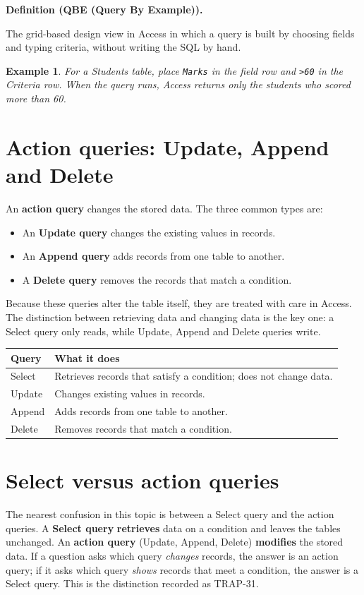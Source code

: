 \documentclass[11pt]{article}
\newtheorem{example}{Example}[section]
\newenvironment{definitionbox}[1]{%
  \par\noindent\textbf{Definition (#1).}\ \itshape
}{\par\vspace{0.3em}}
\begin{document}
\begin{definitionbox}{QBE (Query By Example)}
The grid-based design view in Access in which a query is built by choosing
fields and typing criteria, without writing the SQL by hand.
\end{definitionbox}

\begin{example}
For a Students table, place \texttt{Marks} in the field row and \texttt{>60}
in the Criteria row. When the query runs, Access returns only the students
who scored more than 60.
\end{example}

\section{Action queries: Update, Append and Delete}
An \textbf{action query} changes the stored data. The three common types are:
\begin{itemize}
  \item An \textbf{Update query} changes the existing values in records.
  \item An \textbf{Append query} adds records from one table to another.
  \item A \textbf{Delete query} removes the records that match a condition.
\end{itemize}
Because these queries alter the table itself, they are treated with care in
Access. The distinction between retrieving data and changing data is the key
one: a Select query only reads, while Update, Append and Delete queries
write.

\begin{center}
\begin{tabular}{p{}p{}}
\toprule
\textbf{Query} & \textbf{What it does} \\
\midrule
Select & Retrieves records that satisfy a condition; does not change data. \\
Update & Changes existing values in records. \\
Append & Adds records from one table to another. \\
Delete & Removes records that match a condition. \\
\bottomrule
\end{tabular}
\end{center}

\section{Select versus action queries}
The nearest confusion in this topic is between a Select query and the action
queries. A \textbf{Select query} \textbf{retrieves} data on a condition and
leaves the tables unchanged. An \textbf{action query} (Update, Append,
Delete) \textbf{modifies} the stored data. If a question asks which query
\emph{changes} records, the answer is an action query; if it asks which query
\emph{shows} records that meet a condition, the answer is a Select query.
This is the distinction recorded as TRAP-31.
\end{document}
